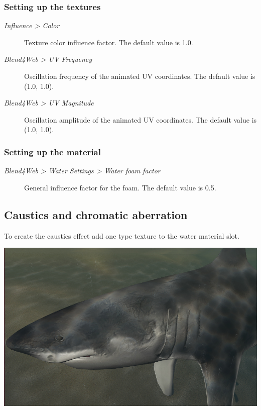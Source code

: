 \documentclass[a4paper,12pt,oneside]{sphinxmanual}
\begin{document}
\subsubsection{Setting up the textures}
\label{outdoor_rendering:id13}\begin{description}
\item[{\emph{Influence \textgreater{} Color}}] \leavevmode
Texture color influence factor. The default value is 1.0.

\item[{\emph{Blend4Web \textgreater{} UV Frequency}}] \leavevmode
Oscillation frequency of the animated UV coordinates. The default value is (1.0, 1.0).

\item[{\emph{Blend4Web \textgreater{} UV Magnitude}}] \leavevmode
Oscillation amplitude of the animated UV coordinates. The default value is (1.0, 1.0).

\end{description}


\subsubsection{Setting up the material}
\label{outdoor_rendering:id14}\begin{description}
\item[{\emph{Blend4Web \textgreater{} Water Settings \textgreater{} Water foam factor}}] \leavevmode
General influence factor for the foam. The default value is 0.5.

\end{description}


\subsection{Caustics and chromatic aberration}
\label{outdoor_rendering:id15}
To create the caustics effect add one  type texture to the water material slot.

{\hfill\includegraphics[width=1.000\linewidth]{water_caustics.jpg}\hfill}
\end{document}
